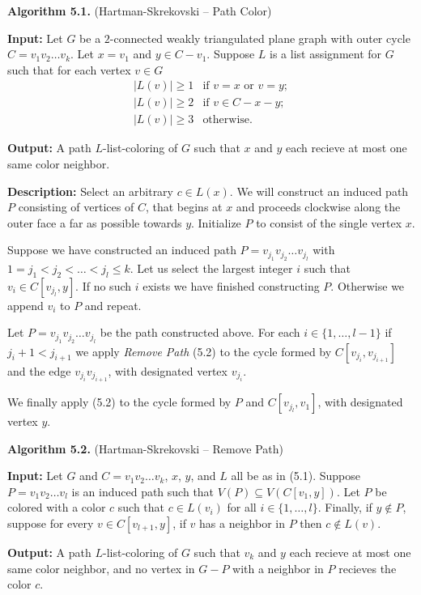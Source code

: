 \documentclass[letterpaper, 12pt]{amsart}
\theoremstyle{definition}
\theoremstyle{definition}
\theoremstyle{thm}
\theoremstyle{definition}
\begin{document}
\noindent\textbf{Algorithm 5.1.} (Hartman-Skrekovski -- Path Color)

\noindent\textbf{Input:} Let $G$ be a $2$-connected weakly triangulated plane
graph with outer cycle $C=v_1v_2\ldots v_k$. Let $x=v_1$ and $y\in C-v_1$.
Suppose $L$ is a list assignment for $G$ such that
for each vertex $v\in G$
\[
    \begin{array}{ll}
	    |L(v)|\ge 1 & \text{if } v=x \text{ or } v=y;\\
	    |L(v)|\ge 2 & \text{if } v\in C-x-y;\\
	    |L(v)|\ge 3 & \text{otherwise.}
    \end{array}
\]

\noindent\textbf{Output:} A path $L$-list-coloring of $G$ such that
$x$ and $y$ each recieve at most one same color neighbor.

\noindent\textbf{Description:} Select an arbitrary $c\in L(x)$. We will construct an induced
path $P$ consisting of vertices of $C$, that begins at $x$ and proceeds
clockwise along the outer face a far as possible towards $y$. Initialize $P$ to consist of
the single vertex $x$.

Suppose we have constructed an induced path $P=v_{j_1}v_{j_2}\ldots v_{j_l}$
with $1=j_1<j_2<\ldots<j_l\le k$. Let us select the largest integer $i$ such that
$v_i\in C[v_{j_l},y]$. If no such $i$ exists we have finished constructing $P$.
Otherwise we append $v_i$ to $P$ and repeat.

Let $P=v_{j_1}v_{j_2}\ldots v_{j_l}$ be the path constructed above. For each
$i\in\{1,\ldots,l-1\}$ if $j_i+1<j_{i+1}$ we apply \textit{Remove Path} (5.2)
to the cycle formed by $C[v_{j_i},v_{j_{i+1}}]$ and the edge
$v_{j_i}v_{j_{i+1}}$, with designated vertex $v_{j_i}$.

We finally apply  (5.2) to the cycle formed by $P$ and
$C[v_{j_l},v_1]$, with designated vertex $y$.

\noindent\textbf{Algorithm 5.2.} (Hartman-Skrekovski -- Remove Path)

\noindent\textbf{Input:} Let $G$ and $C=v_1v_2\ldots v_k$, $x$, $y$, and $L$ all
be as in (5.1). Suppose $P=v_1v_2\ldots v_l$ is an induced path such that $V(P)
\subseteq V(C[v_1,y])$. Let $P$ be colored with a
color $c$ such that $c\in L(v_i)$ for all $i\in\{1,\ldots,l\}$. Finally, if
$y\not\in P$, suppose for every $v\in C[v_{l+1},y]$, if $v$ has a neighbor in $P$
then $c\not\in L(v)$.

\noindent\textbf{Output:} A path $L$-list-coloring of $G$ such that $v_k$ and
$y$ each recieve at most one same color neighbor, and no vertex in
$G-P$ with a neighbor in $P$ recieves the color $c$.
\end{document}
